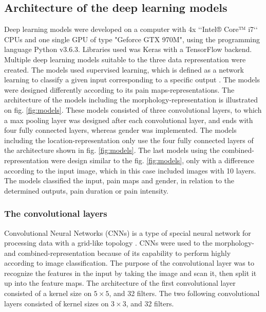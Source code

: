 \subsection*{\textbf{Architecture of the deep learning models}}
Deep learning models were developed on a computer with 4x ‘‘Intel® Core™ i7‘‘ CPUs and one single GPU of type "Geforce GTX 970M", using the programming language Python v3.6.3. Libraries used was Keras with a TensorFlow backend. \newline
\noindent
Multiple deep learning models suitable to the three data representation were created. The models used supervised learning, which is defined as a network learning to classify a given input corresponding to a specific output \citep{Goodfellow2016}. The models were designed differently according to its pain maps-representations. The architecture of the models including the morphology-representation is illustrated on fig. \ref{fig:models}. These models consisted of  three convolutional layers, to which a max pooling layer was designed after each convolutional layer, and ends with four fully connected layers, whereas gender was implemented. The models including the location-representation only use the four fully connected layers of the architecture shown in fig. \ref{fig:models}. The last models using the combined-representation were design similar to the fig. \ref{fig:models}, only with a difference according to the input image, which in this case included images with 10 layers. The models classified the input, pain maps and gender, in relation to the determined outputs, pain duration or pain intensity.

\subsubsection*{\textbf{The convolutional layers}}
Convolutional Neural Networks (CNNs) is a type of special neural network for processing data with a grid-like topology \citep{Goodfellow2016}. CNNs were used to the morphology- and combined-representation because of its capability to perform highly according to image classification. The purpose of the convolutional layer was to recognize the features in the input by taking the image and scan it, then split it up into the feature maps.\citep{Goodfellow2016,LeCun1998} The architecture of the first convolutional layer consisted of a kernel size on $5 \times 5$, and 32 filters. The two following convolutional layers consisted of kernel sizes on $3 \times 3$, and 32 filters. 

